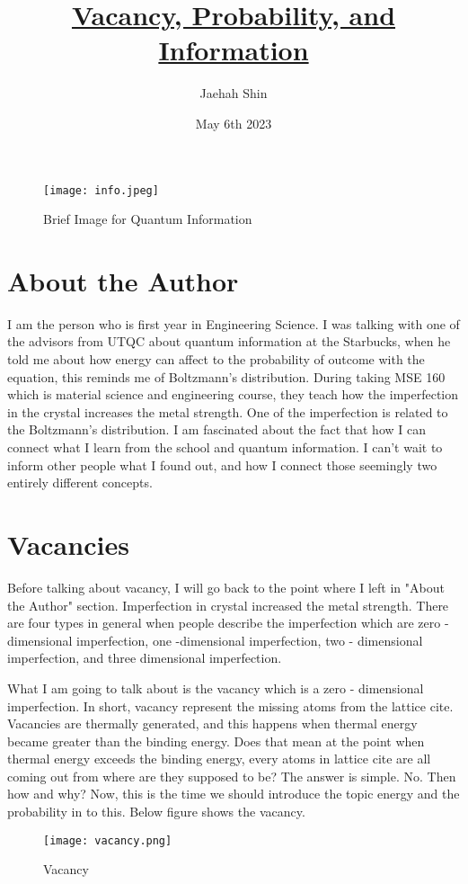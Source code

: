 \documentclass{article}
\title{\underline {\textbf{Vacancy, Probability, and Information}}}
\author{Jaehah Shin}
\date{May 6th 2023}
\begin{document}
\maketitle
\begin{figure}[h]
    \centering
    \texttt{[image: info.jpeg]}
    \caption{Brief Image for Quantum Information}
    \label{fig:z}
\end{figure}

\section{About the Author}
I am the person who is first year in Engineering Science. I was talking with one of the advisors from UTQC about quantum information at the Starbucks, when he told me about how energy can affect to the probability of outcome with the equation, this reminds me of Boltzmann's distribution. 
During taking MSE 160 which is material science and engineering course, they teach how the imperfection in the crystal increases the metal strength. One of the imperfection is related to the Boltzmann's distribution. I am fascinated about the fact that how I can connect what I learn from the school and quantum information. I can't wait to inform other people what I found out, and how I connect those seemingly two entirely different concepts. 
\section{Vacancies}
Before talking about vacancy, I will go back to the point where I left in "About the Author" section. Imperfection in crystal increased the metal strength. There are four types in general when people describe the imperfection which are zero - dimensional imperfection, one -dimensional imperfection, two - dimensional imperfection, and three dimensional imperfection. 

What I am going to talk about is the vacancy which is a zero - dimensional imperfection. In short, vacancy represent the missing atoms from the lattice cite. Vacancies are thermally generated, and this happens when thermal energy became greater than the binding energy. Does that mean at the point when thermal energy exceeds the binding energy, every atoms in lattice cite are all coming out from where are they supposed to be? The answer is simple. No. Then how and why? Now, this is the time we should introduce the topic energy and the probability in to this.
Below figure shows the vacancy.
\begin{figure}[h]
    \centering
    \texttt{[image: vacancy.png]}
    \caption{Vacancy}
    \label{fig:Vacancy}
\end{figure}
\end{document}
